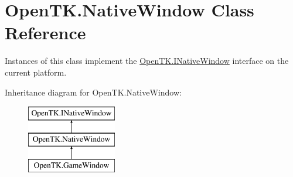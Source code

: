 \hypertarget{class_open_t_k_1_1_native_window}{\section{Open\-T\-K.\-Native\-Window Class Reference}
\label{class_open_t_k_1_1_native_window}
}


Instances of this class implement the \hyperlink{interface_open_t_k_1_1_i_native_window}{Open\-T\-K.\-I\-Native\-Window} interface on the current platform.  


Inheritance diagram for Open\-T\-K.\-Native\-Window\-:\begin{figure}[H]
\begin{center}
\leavevmode
\includegraphics[height=3.000000cm]{class_open_t_k_1_1_native_window}
\end{center}
\end{figure}
